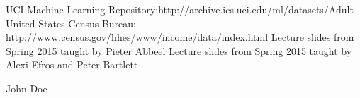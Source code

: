 \documentclass[conference]{IEEEtran}
\begin{document}

%
%
%
\begin{thebibliography}{1}

UCI Machine Learning Repository:http://archive.ics.uci.edu/ml/datasets/Adult
United States Census Bureau: http://www.census.gov/hhes/www/income/data/index.html
Lecture slides from Spring 2015 taught by Pieter Abbeel
Lecture slides from Spring 2015 taught by Alexi Efros and Peter Bartlett 
\end{thebibliography}

% 

\begin{IEEEbiography}{John Doe}
\blindtext
\end{IEEEbiography}




\end{document}
